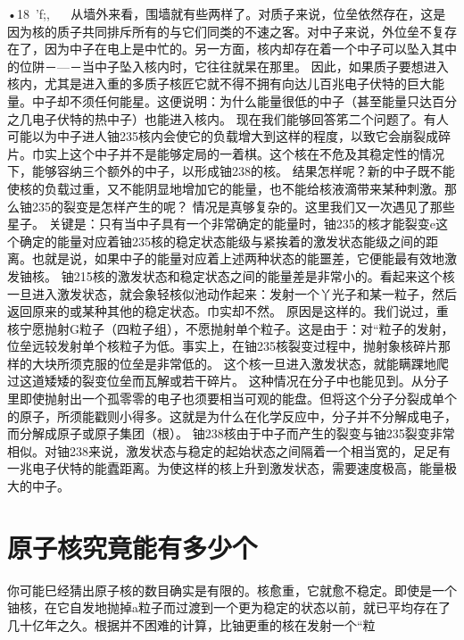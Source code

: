 •18~'f;,
  
从墙外来看，围墙就有些两样了。对质子来说，位垒依然存在，这是因为核的质子共同排斥所有的与它们同类的不速之客。对中子来说，外位垒不复存在了，因为中子在电上是中忙的。另一方面，核内却存在着一个中子可以坠入其中的位阱－—－当中子坠入核内时，它往往就杲在那里。
因此，如果质子要想进入核内，尤其是进入重的多质子核匠它就不得不拥有向达儿百兆电子伏特的巨大能量。中子却不须任何能星。这便说明：为什么能量很低的中子（甚至能量只达百分之几电子伏特的热中子）也能进入核内。
现在我们能够回答笫二个问题了。有人可能以为中子进人铀235核内会使它的负载增大到这样的程度，以致它会崩裂成碎片。巾实上这个中子并不是能够定局的一着棋。这个核在不危及其稳定性的情况下，能够容纳三个额外的中子，以形成铀238的核。
结果怎样呢？新的中子既不能使核的负载过重，又不能阴显地增加它的能量，也不能给核液滴带来某种刺激。那么铀235的裂变是怎样产生的呢？
情况是真够复杂的。这里我们又一次遇见了那些星子。
关键是：只有当中子具有一个非常确定的能量时，铀235的核才能裂变e这个确定的能量对应着铀235核的稳定状态能级与紧挨着的激发状态能级之间的距离。也就是说，如果中子的能量对应着上述两种状态的能噩差，它便能最有效地激发铀核。
铀215核的激发状态和稳定状态之间的能量差是非常小的。看起来这个核一旦进入激发状态，就会象轻核似池动作起来：发射一个丫光子和某一粒子，然后返回原来的或某种其他的稳定状态。巾实却不然。
原因是这样的。我们说过，重核宁愿抛射G粒子（四粒子组），不愿抛射单个粒子。这是由于：对“粒子的发射，位垒远较发射单个核粒子为低。事实上，在铀235核裂变过程中，抛射象核碎片那样的大块所须克服的位垒是非常低的。
这个核一旦进入激发状态，就能瞒踝地爬过这道矮矮的裂变位垒而瓦解或若干碎片。
这种情况在分子中也能见到。从分子里即使抛射出一个孤零零的电子也须要相当可观的能盘。但将这个分子分裂成单个的原子，所须能戳则小得多。这就是为什么在化学反应中，分子并不分解成电子，而分解成原子或原子集团（根）。
铀238核由于中子而产生的裂变与铀235裂变非常相似。对铀238来说，激发状态与稳定的起始状态之间隔着一个相当宽的，足足有一兆电子伏特的能蠹距离。为使这样的核上升到激发状态，需要速度极高，能量极大的中子。

\section{原子核究竟能有多少个}
你可能巳经猜出原子核的数目确实是有限的。核愈重，它就愈不稳定。即使是一个铀核，在它自发地抛掉a粒子而过渡到一个更为稳定的状态以前，就已平均存在了几十亿年之久。根据并不困难的计算，比铀更重的核在发射一个“粒

